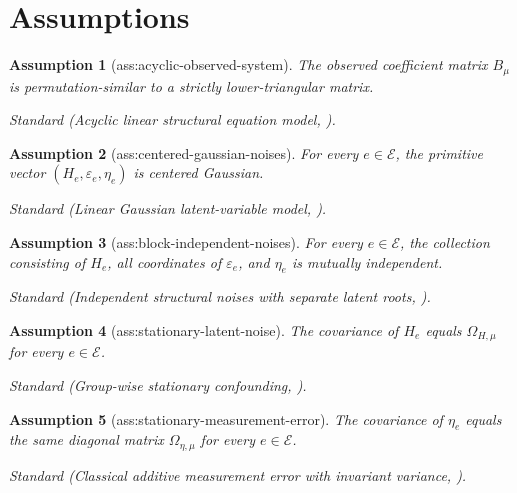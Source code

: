 \documentclass{article}
\newtheorem{assumption}{Assumption}
\begin{document}
\section{Assumptions}

\begin{assumption}[ass:acyclic-observed-system]\label{ass:acyclic-observed-system}
The observed coefficient matrix \(B_{\mu}\) is permutation-similar to a strictly lower-triangular matrix.
\par\smallskip\noindent\emph{Standard} (Acyclic linear structural equation model, \cite{YangSalehkaleybarKiyavash2024LIT}).
\end{assumption}

\begin{assumption}[ass:centered-gaussian-noises]\label{ass:centered-gaussian-noises}
For every \(e\in\mathcal E\), the primitive vector \((H_e,\varepsilon_e,\eta_e)\) is centered Gaussian.
\par\smallskip\noindent\emph{Standard} (Linear Gaussian latent-variable model, \cite{VariciEtAl2022LatentTargets}).
\end{assumption}

\begin{assumption}[ass:block-independent-noises]\label{ass:block-independent-noises}
For every \(e\in\mathcal E\), the collection consisting of \(H_e\), all coordinates of \(\varepsilon_e\), and \(\eta_e\) is mutually independent.
\par\smallskip\noindent\emph{Standard} (Independent structural noises with separate latent roots, \cite{YangGhassamiNafeaKiyavashZhangShpitser2022MeasurementError}).
\end{assumption}

\begin{assumption}[ass:stationary-latent-noise]\label{ass:stationary-latent-noise}
The covariance of \(H_e\) equals \(\Omega_{H,\mu}\) for every \(e\in\mathcal E\).
\par\smallskip\noindent\emph{Standard} (Group-wise stationary confounding, \cite{PfisterWeichwaldBuhlmannScholkopf2019CoroICA}).
\end{assumption}

\begin{assumption}[ass:stationary-measurement-error]\label{ass:stationary-measurement-error}
The covariance of \(\eta_e\) equals the same diagonal matrix \(\Omega_{\eta,\mu}\) for every \(e\in\mathcal E\).
\par\smallskip\noindent\emph{Standard} (Classical additive measurement error with invariant variance, \cite{YangGhassamiNafeaKiyavashZhangShpitser2022MeasurementError}).
\end{assumption}
\end{document}
